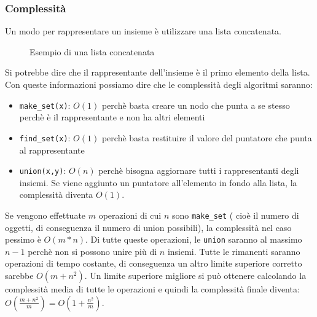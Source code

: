 \documentclass[a4paper]{article}
\begin{document}
\subsubsection{Complessità}
Un modo per rappresentare un insieme è utilizzare una lista concatenata.
\begin{figure}[H]
  \centering
  \caption{Esempio di una lista concatenata}
\end{figure}
\noindent
Si potrebbe dire che il rappresentante dell'insieme è il primo elemento della lista.
Con queste informazioni possiamo dire che le complessità degli algoritmi saranno:
\begin{itemize}
  \item \texttt{make\_set(x)}: \( O(1) \) perchè basta creare un nodo che punta a se stesso
    perchè è il rappresentante e non ha altri elementi
  \item \texttt{find\_set(x)}: \( O(1) \) perchè basta restituire il valore del puntatore
    che punta al rappresentante
  \item \texttt{union(x,y)}: \( O(n) \) perchè bisogna aggiornare tutti i rappresentanti
    degli insiemi. Se viene aggiunto un puntatore all'elemento in fondo alla lista,
    la complessità diventa \( O(1) \).
\end{itemize}
Se vengono effettuate \( m \) operazioni di cui \( n \) sono \texttt{make\_set} (
cioè il numero di oggetti, di conseguenza il numero di union possibili),
la complessità nel caso pessimo è \( O(m*n) \). Di tutte queste operazioni, le
\texttt{union} saranno al massimo \( n-1 \) perchè non si possono unire più di
\( n \) insiemi. Tutte le rimanenti saranno operazioni di tempo costante, di
conseguenza un altro limite superiore corretto sarebbe \( O(m+n^2) \). Un limite
superiore migliore si può ottenere calcolando la complessità media di tutte le operazioni
e quindi la complessità finale diventa: \( O(\frac{m+n^2}{m}) = O(1 + \frac{n^2}{m}) \).
\end{document}
